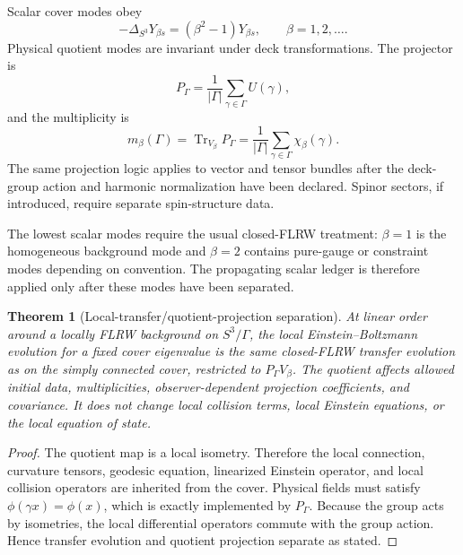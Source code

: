 \documentclass[
  aps,
  prd,
  reprint,
  superscriptaddress,
  floatfix,
  nofootinbib,
  longbibliography
]{revtex4-2}
\theoremstyle{plain}
\newtheorem{theorem}{Theorem}
\theoremstyle{definition}
\theoremstyle{remark}
\newcommand{\Tr}{\operatorname{Tr}}
\newcommand{\PG}{P_{\Gamma}}
\begin{document}
Scalar cover modes obey
\begin{equation}
-\Delta_{S^3}Y_{\beta s}=(\beta^2-1)Y_{\beta s},
\qquad
\beta=1,2,\ldots.
\label{eq:scalar_modes}
\end{equation}
Physical quotient modes are invariant under deck transformations.  The projector is
\begin{equation}
\boxed{
\PG=\frac1{|\Gamma|}\sum_{\gamma\in\Gamma}U(\gamma),
}
\label{eq:projector}
\end{equation}
and the multiplicity is
\begin{equation}
\boxed{
m_\beta(\Gamma)=\Tr_{V_\beta}\PG
=\frac1{|\Gamma|}\sum_{\gamma\in\Gamma}\chi_\beta(\gamma).
}
\label{eq:multiplicity}
\end{equation}
The same projection logic applies to vector and tensor bundles after the deck-group action and harmonic normalization have been declared.  Spinor sectors, if introduced, require separate spin-structure data.

The lowest scalar modes require the usual closed-FLRW treatment: \(\beta=1\) is the homogeneous background mode and \(\beta=2\) contains pure-gauge or constraint modes depending on convention.  The propagating scalar ledger is therefore applied only after these modes have been separated.

\begin{theorem}[Local-transfer/quotient-projection separation]
At linear order around a locally FLRW background on \(S^3/\Gamma\), the local Einstein--Boltzmann evolution for a fixed cover eigenvalue is the same closed-FLRW transfer evolution as on the simply connected cover, restricted to \(\PG V_\beta\).  The quotient affects allowed initial data, multiplicities, observer-dependent projection coefficients, and covariance.  It does not change local collision terms, local Einstein equations, or the local equation of state.
\end{theorem}

\begin{proof}
The quotient map is a local isometry.  Therefore the local connection, curvature tensors, geodesic equation, linearized Einstein operator, and local collision operators are inherited from the cover.  Physical fields must satisfy \(\phi(\gamma x)=\phi(x)\), which is exactly implemented by \(\PG\).  Because the group acts by isometries, the local differential operators commute with the group action.  Hence transfer evolution and quotient projection separate as stated.
\end{proof}
\end{document}

